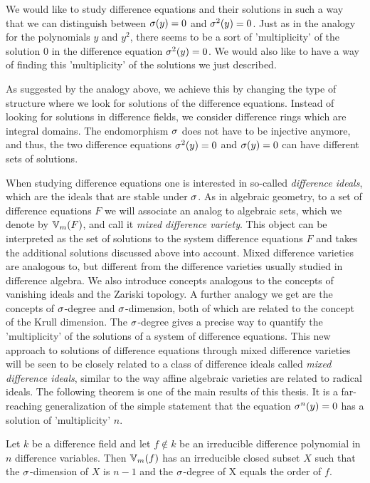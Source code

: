 We would like to study difference equations and their solutions in such a way that we can distinguish between $\sigma(y) = 0$ and $\sigma^2(y) = 0$. Just as in the analogy for the polynomials $y$ and $y^2$,
there seems to be a sort of 'multiplicity' of the solution $0$ in the difference equation $\sigma^2(y) = 0$. We would also like to have a way of finding this 'multiplicity' of the solutions we just described.

As suggested by the analogy above, we achieve this by changing the type of structure where we look for solutions of the difference equations. Instead of looking for solutions in difference fields,
we consider difference rings which are integral domains. The endomorphism $\sigma$ does not have to be injective anymore, and thus, the two difference equations $\sigma^2(y) = 0$ and $\sigma(y) = 0$ can have different sets of solutions.

When studying difference equations one is interested in so-called \emph{difference ideals}, which are the ideals that are stable under $\sigma$. 
As in algebraic geometry, to a set of difference equations $F$ we will associate an analog to algebraic sets, which we denote by $\mathbb{V}_m(F)$, 
and call it \emph{mixed difference variety}. 
This object can be interpreted as the set of solutions to the system difference equations $F$  and takes the additional solutions discussed above into account.
Mixed difference varieties are analogous to, but different from the difference varieties usually studied in difference algebra.
We also introduce concepts analogous to the concepts of vanishing ideals and the Zariski topology.
A further analogy  we get are the concepts of $\sigma$-degree and $\sigma$-dimension, both of which are related to the concept of the Krull dimension.
The $\sigma$-degree gives a precise way to quantify the 'multiplicity' of the solutions of a system of difference equations.
This new approach to solutions of difference equations through mixed difference varieties will be seen to be closely related to a class of difference ideals called \emph{mixed difference ideals},
similar to the way affine algebraic varieties are related to radical ideals.
The following theorem is one of the main results of this thesis. It is a far-reaching generalization of the simple statement that the equation $\sigma^n(y) = 0$ has a solution of 'multiplicity' $n$.

\begin{theorem*}[\ref{corfinal}]
Let $k$ be a difference field and let $f \notin k$ be an irreducible difference polynomial in $n$ difference variables. 
Then $\mathbb{V}_m(f)$ has an irreducible closed subset $X$ such that the $\sigma$-dimension of $X$ is $n-1$ and the $\sigma$-degree of X equals the order of $f$.
\end{theorem*}

